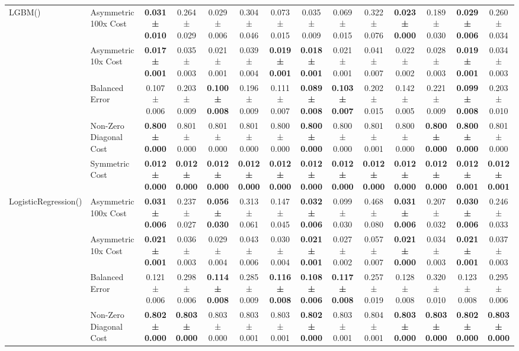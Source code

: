 \begin{table}[H]
{\begin{tabular}{llcccccccccccc}
\cline{1-14}
\multirow[t]{5}{*}{LGBM()} & Asymmetric 100x Cost & \textbf{0.031 ± 0.010} & 0.264 ± 0.029 & 0.029 ± 0.006 & 0.304 ± 0.046 & 0.073 ± 0.015 & 0.035 ± 0.009 & 0.069 ± 0.015 & 0.322 ± 0.076 & \textbf{0.023 ± 0.000} & 0.189 ± 0.030 & \textbf{0.029 ± 0.006} & 0.260 ± 0.034 \\
 & Asymmetric 10x Cost & \textbf{0.017 ± 0.001} & 0.035 ± 0.003 & 0.021 ± 0.001 & 0.039 ± 0.004 & \textbf{0.019 ± 0.001} & \textbf{0.018 ± 0.001} & 0.021 ± 0.001 & 0.041 ± 0.007 & 0.022 ± 0.002 & 0.028 ± 0.003 & \textbf{0.019 ± 0.001} & 0.034 ± 0.003 \\
 & Balanced Error & 0.107 ± 0.006 & 0.203 ± 0.009 & \textbf{0.100 ± 0.008} & 0.196 ± 0.009 & 0.111 ± 0.007 & \textbf{0.089 ± 0.008} & \textbf{0.103 ± 0.007} & 0.202 ± 0.015 & 0.142 ± 0.005 & 0.221 ± 0.009 & \textbf{0.099 ± 0.008} & 0.203 ± 0.010 \\
 & Non-Zero Diagonal Cost & \textbf{0.800 ± 0.000} & 0.801 ± 0.000 & 0.801 ± 0.000 & 0.801 ± 0.000 & 0.800 ± 0.000 & \textbf{0.800 ± 0.000} & 0.800 ± 0.000 & 0.801 ± 0.001 & 0.800 ± 0.000 & \textbf{0.800 ± 0.000} & \textbf{0.800 ± 0.000} & 0.801 ± 0.000 \\
 & Symmetric Cost & \textbf{0.012 ± 0.000} & \textbf{0.012 ± 0.000} & \textbf{0.012 ± 0.000} & \textbf{0.012 ± 0.000} & \textbf{0.012 ± 0.000} & \textbf{0.012 ± 0.000} & \textbf{0.012 ± 0.000} & \textbf{0.012 ± 0.000} & \textbf{0.012 ± 0.000} & \textbf{0.012 ± 0.000} & \textbf{0.012 ± 0.001} & \textbf{0.012 ± 0.001} \\
\cline{1-14}
\multirow[t]{5}{*}{LogisticRegression()} & Asymmetric 100x Cost & \textbf{0.031 ± 0.006} & 0.237 ± 0.027 & \textbf{0.056 ± 0.030} & 0.313 ± 0.061 & 0.147 ± 0.045 & \textbf{0.032 ± 0.006} & 0.099 ± 0.030 & 0.468 ± 0.080 & \textbf{0.031 ± 0.006} & 0.207 ± 0.032 & \textbf{0.030 ± 0.006} & 0.246 ± 0.033 \\
 & Asymmetric 10x Cost & \textbf{0.021 ± 0.001} & 0.036 ± 0.003 & 0.029 ± 0.004 & 0.043 ± 0.006 & 0.030 ± 0.004 & \textbf{0.021 ± 0.001} & 0.027 ± 0.002 & 0.057 ± 0.007 & \textbf{0.021 ± 0.000} & 0.034 ± 0.003 & \textbf{0.021 ± 0.001} & 0.037 ± 0.003 \\
 & Balanced Error & 0.121 ± 0.006 & 0.298 ± 0.006 & \textbf{0.114 ± 0.008} & 0.285 ± 0.009 & \textbf{0.116 ± 0.008} & \textbf{0.108 ± 0.006} & \textbf{0.117 ± 0.008} & 0.257 ± 0.019 & 0.128 ± 0.008 & 0.320 ± 0.010 & 0.123 ± 0.008 & 0.295 ± 0.006 \\
 & Non-Zero Diagonal Cost & \textbf{0.802 ± 0.000} & \textbf{0.803 ± 0.000} & 0.803 ± 0.000 & 0.803 ± 0.001 & 0.803 ± 0.001 & \textbf{0.802 ± 0.000} & 0.803 ± 0.001 & 0.804 ± 0.001 & \textbf{0.803 ± 0.000} & \textbf{0.803 ± 0.000} & \textbf{0.802 ± 0.000} & \textbf{0.803 ± 0.000} \\

\end{tabular}}
\end{table}

